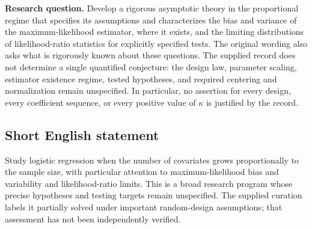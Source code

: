 \documentclass[11pt]{article}
\begin{document}
\textbf{Research question.} Develop a rigorous asymptotic theory in the proportional regime that specifies its assumptions and characterizes the bias and variance of the maximum-likelihood estimator, where it exists, and the limiting distributions of likelihood-ratio statistics for explicitly specified tests. The original wording also asks what is rigorously known about these questions. The supplied record does not determine a single quantified conjecture: the design law, parameter scaling, estimator existence regime, tested hypotheses, and required centering and normalization remain unspecified. In particular, no assertion for every design, every coefficient sequence, or every positive value of \(\kappa\) is justified by the record.
\subsection{Short English statement}
Study logistic regression when the number of covariates grows proportionally to the sample size, with particular attention to maximum-likelihood bias and variability and likelihood-ratio limits. This is a broad research program whose precise hypotheses and testing targets remain unspecified. The supplied curation labels it partially solved under important random-design assumptions; that assessment has not been independently verified.
\end{document}
